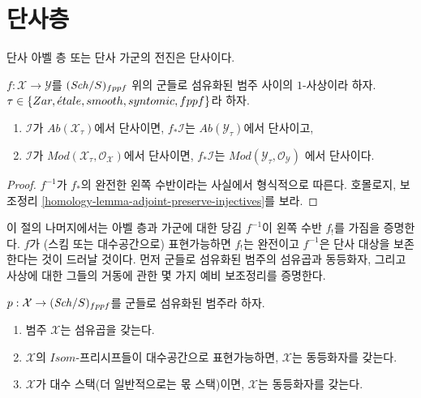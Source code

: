\section{단사층}
\label{section-lower-shriek}

\noindent
단사 아벨 층 또는 단사 가군의 전진은 단사이다.

\begin{lemma}
\label{lemma-pushforward-injective}
$f : \mathcal{X} \to \mathcal{Y}$를 $(\mathit{Sch}/S)_{fppf}$ 위의
군들로 섬유화된 범주 사이의 $1$-사상이라 하자.
$\tau \in \{Zar, {\acute{e}tale}, smooth, syntomic, fppf\}$라 하자.
\begin{enumerate}
\item $\mathcal{I}$가 $\textit{Ab}(\mathcal{X}_\tau)$에서 단사이면,
$f_*\mathcal{I}$는 $\textit{Ab}(\mathcal{Y}_\tau)$에서 단사이고,
\item $\mathcal{I}$가
$\textit{Mod}(\mathcal{X}_\tau, \mathcal{O}_\mathcal{X})$에서 단사이면,
$f_*\mathcal{I}$는
$\textit{Mod}(\mathcal{Y}_\tau, \mathcal{O}_\mathcal{Y})$
에서 단사이다.
\end{enumerate}
\end{lemma}

\begin{proof}
$f^{-1}$가 $f_*$의 완전한 왼쪽 수반이라는 사실에서 형식적으로 따른다.
호몰로지, 보조정리 \ref{homology-lemma-adjoint-preserve-injectives}를 보라.
\end{proof}

\noindent
이 절의 나머지에서는 아벨 층과 가군에 대한 당김 $f^{-1}$이
왼쪽 수반 $f_!$를 가짐을 증명한다. $f$가 (스킴 또는
대수공간으로) 표현가능하면 $f_!$는 완전이고 $f^{-1}$은 단사 대상을
보존한다는 것이 드러날 것이다. 먼저 군들로 섬유화된 범주의 섬유곱과
동등화자, 그리고 사상에 대한 그들의 거동에 관한 몇 가지 예비
보조정리를 증명한다.

\begin{lemma}
\label{lemma-fibre-products}
$p : \mathcal{X} \to (\mathit{Sch}/S)_{fppf}$를 군들로 섬유화된 범주라 하자.
\begin{enumerate}
\item 범주 $\mathcal{X}$는 섬유곱을 갖는다.
\item $\mathcal{X}$의 $\mathit{Isom}$-프리시프들이
대수공간으로 표현가능하면, $\mathcal{X}$는 동등화자를 갖는다.
\item $\mathcal{X}$가 대수 스택(더 일반적으로는 몫 스택)이면,
$\mathcal{X}$는 동등화자를 갖는다.
\end{enumerate}
\end{lemma}

